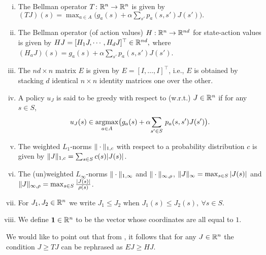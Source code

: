 \documentclass[twocolumn]{IEEEtran}
\begin{document}
\begin{definition}\label{notations}
\begin{comment}
Let $c,\rho,\chi:S \to \R_+$ be positive valued functions, where $\R_+$ denotes the set of strictly positive reals. Then for $J\in \R^n$, $a\in A$ and $s\in S$,
define
\end{comment}
\begin{enumerate}[(i)]
\item\label{bellopval} The Bellman operator $T\colon \mathbb{R}^n \rightarrow \mathbb{R}^n$ is given by $(TJ)(s)=\max_{a \in A}\big(g_a(s)+\alpha \sum_{s'} p_a(s,s')J(s')\big).
$
\item \label{bellactval} The Bellman operator (of action values) $H: \mathbb{R}^n \to \mathbb{R}^{nd}$ for state-action values is given by $HJ=[ H_1 J,\cdots,H_d J]^\top\in \mathbb{R}^{nd},$ where $(H_a J)(s)= g_a(s)+\alpha \sum_{s'}p_a(s,s') J(s')$.
\item\label{emat} The $nd\times n$ matrix $E$ is given by $E=[I,\ldots,I]^\top$, i.e., $E$ is obtained by stacking $d$ identical $n\times n$ identity matrices one over the other.
\item\label{greedy} A policy $u_J$ is said to be greedy with respect to (w.r.t.) $J\in \mathbb{R}^n$ if for any $s\in S$,
\begin{align*} u_J(s)\in\underset{a\in A}{\operatorname{argmax}}\big(g_a(s)+\alpha \underset{s'\in S}{\sum}~ p_a(s,s')J(s')\big).\end{align*}
\item\label{norms} The weighted $L_1$-norms $\|\cdot\|_{1,c}$ with respect to a probability distribution $c$ is given by $
\|J\|_{1,c}=\sum_{s \in S} c(s)|J(s)|$.
\item The (un)weighted $L_\infty$-norms $\|\cdot\|_{1,\infty}$
and $\|\cdot\|_{\infty,\rho}$, $\|J\|_{\infty}=\max_{s\in S}|J(s)|$ and $\|J\|_{\infty,\rho}=\max_{s \in S} \frac{|J(s)|}{\rho(s)}$.
\item For $J_1, J_2\in \mathbb{R}^n$ we write $J_1\leq J_2$ when $J_1(s)\leq J_2(s),~\forall s\in S$.
\item We define $\mathbf{1}\in \mathbb{R}^n$ to be the vector whose coordinates are all equal to $1$.
\end{enumerate}
\end{definition}
We would like to point out that from , it follows that for any $J\in \mathbb{R}^n$ the condition $J\geq TJ$ can be rephrased as $EJ\geq HJ$.
\end{document}
